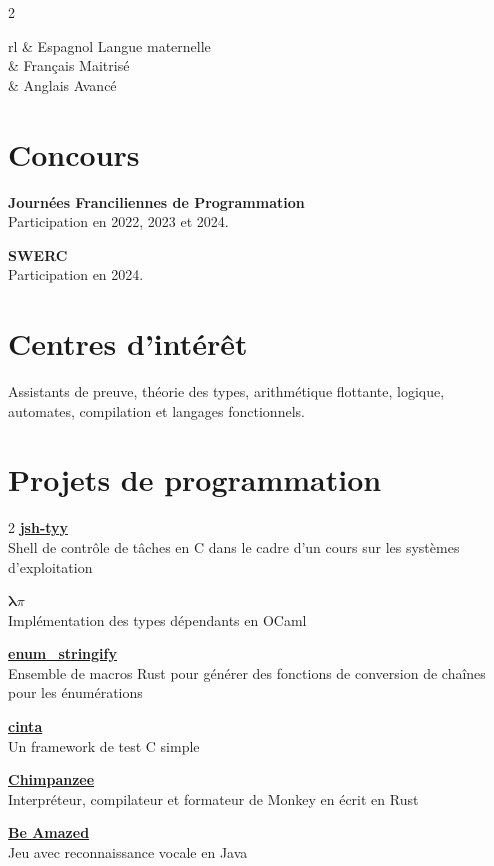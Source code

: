 \documentclass[12pt]{article}
\newcommand{\entry}[4]{{{\textbf{#1}}} \hfill #3 \\ #2 \hfill #4}
\newcommand{\tableentry}[3]{\textsc{#1} & #2\expandafter\ifstrequal\expandafter{#3}{}{\\}{\\[6pt]}}
\begin{document}
\begin{paracol}{2}
\begin{supertabular}{rl}
		\tableentry{\footnotesize\faLanguage}{Espagnol \textperiodcentered{} Langue maternelle}{}
		\tableentry{}{Français \textperiodcentered{} Maitrisé}{}
		\tableentry{}{Anglais \textperiodcentered{} Avancé}{}
	\end{supertabular}


	\section{Concours}

	\textbf{Journées Franciliennes de Programmation}\\
	\noindent Participation en 2022, 2023 et 2024.

	\textbf{SWERC}\\
	\noindent Participation en 2024.

	\section{Centres d'intérêt}
	\justifying

	Assistants de preuve, théorie des types, arithmétique flottante, logique, automates, compilation et langages fonctionnels.

\end{paracol}

\newpage %

\section{Projets de programmation}

\begin{paracol}{2}
	\entry{\href{https://github.com/Yag000/jsh-tyy}{jsh-tyy}}{Shell de contrôle de tâches en C dans le cadre d'un cours sur les systèmes d'exploitation}{ }{ }
	\medskip
	\switchcolumn

	\entry{\href{https://moule.informatique.univ-paris-diderot.fr/iglesias/U3bbU3c0}{$\pmb\lambda\pi$}}{Implémentation des types dépendants en OCaml}{ }{ }
	\medskip
	\switchcolumn

	\entry{\href{https://github.com/Yag000/enum_stringify}{enum\_stringify}}{Ensemble de macros Rust pour générer des fonctions de conversion de chaînes pour les énumérations}{ }{ }
	\bigskip
	\switchcolumn

	\entry{\href{https://github.com/Yag000/cinta}{cinta}}{Un framework de test C simple}{ }{ }
	\bigskip
	\bigskip
	\switchcolumn

	\entry{\href{https://github.com/Yag000/chimpanzee}{Chimpanzee}}{Interpréteur, compilateur et formateur de Monkey en écrit en Rust}{ }{ }
	\switchcolumn

	\entry{\href{https://github.com/GabinDDL/L2S2-GYTMY-Game}{Be Amazed}}{Jeu avec reconnaissance vocale en Java}{ }{ }

\end{paracol}

\nocite{*}
\renewcommand{\refname}{Publications} %


\end{document}
